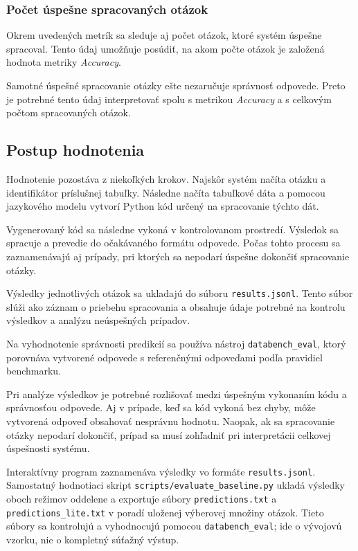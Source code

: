 \subsubsection{Počet úspešne spracovaných otázok}

Okrem uvedených metrík sa sleduje aj počet otázok, ktoré systém úspešne spracoval. Tento údaj umožňuje posúdiť, na akom počte otázok je založená hodnota metriky \textit{Accuracy}.

Samotné úspešné spracovanie otázky ešte nezaručuje správnosť odpovede. Preto je potrebné tento údaj interpretovať spolu s metrikou \textit{Accuracy} a s celkovým počtom spracovaných otázok.

\subsection{Postup hodnotenia}

Hodnotenie pozostáva z niekoľkých krokov. Najskôr systém načíta otázku a identifikátor príslušnej tabuľky. Následne načíta tabuľkové dáta a pomocou jazykového modelu vytvorí Python kód určený na spracovanie týchto dát.

Vygenerovaný kód sa následne vykoná v kontrolovanom prostredí. Výsledok sa spracuje a prevedie do očakávaného formátu odpovede. Počas tohto procesu sa zaznamenávajú aj prípady, pri ktorých sa nepodarí úspešne dokončiť spracovanie otázky.

Výsledky jednotlivých otázok sa ukladajú do súboru
\texttt{results.jsonl}. Tento súbor slúži ako záznam o priebehu spracovania a obsahuje údaje potrebné na kontrolu výsledkov a analýzu neúspešných prípadov.

Na vyhodnotenie správnosti predikcií sa používa nástroj
\texttt{databench\_eval}, ktorý porovnáva vytvorené odpovede s referenčnými odpoveďami podľa pravidiel benchmarku.

Pri analýze výsledkov je potrebné rozlišovať medzi úspešným vykonaním kódu a správnosťou odpovede. Aj v prípade, keď sa kód vykoná bez chyby, môže vytvorená odpoveď obsahovať nesprávnu hodnotu. Naopak, ak sa spracovanie otázky nepodarí dokončiť, prípad sa musí zohľadniť pri interpretácii celkovej úspešnosti systému.

Interaktívny program zaznamenáva výsledky vo formáte
\texttt{results.jsonl}. Samostatný hodnotiaci skript
\texttt{scripts/evaluate\_baseline.py} ukladá výsledky oboch režimov oddelene a exportuje súbory
\texttt{predictions.txt} a \texttt{predictions\_lite.txt} v poradí uloženej výberovej množiny otázok. Tieto súbory sa kontrolujú a vyhodnocujú pomocou \texttt{databench\_eval}; ide o vývojovú vzorku, nie o kompletný súťažný výstup.

